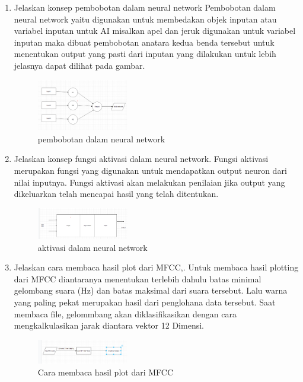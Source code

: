 \begin{enumerate}
	\item Jelaskan konsep pembobotan dalam neural network
	\hfill\break
	Pembobotan dalam neural network yaitu digunakan untuk membedakan objek inputan atau variabel inputan untuk AI misalkan apel dan jeruk digunakan untuk variabel inputan maka dibuat pembobotan anatara kedua benda tersebut untuk menentukan output yang pasti dari inputan yang dilakukan untuk lebih jelasnya dapat dilihat pada gambar.
    \begin{figure}[H]
	\centering
		\includegraphics[width=4cm]{figures/1174096/tugas6/teori_3.PNG}
		\caption{pembobotan dalam neural network}
	\end{figure}

	\item Jelaskan konsep fungsi aktivasi dalam neural network.
	\hfill\break
	Fungsi aktivasi merupakan fungsi yang digunakan untuk mendapatkan output neuron dari nilai inputnya. Fungsi aktivasi akan melakukan penilaian jika output yang dikeluarkan telah mencapai hasil yang telah ditentukan. 
    \begin{figure}[H]
	\centering
		\includegraphics[width=4cm]{figures/1174096/tugas6/teori_4.PNG}
		\caption{aktivasi dalam neural network}
	\end{figure}

	\item Jelaskan cara membaca hasil plot dari MFCC,.
	\hfill\break
	Untuk membaca hasil plotting dari MFCC diantaranya menentukan terlebih dahulu batas minimal gelombang suara (Hz) dan batas maksimal dari suara tersebut. Lalu warna yang paling pekat merupakan hasil dari penglohana data tersebut. Saat membaca file, gelommbang akan diklasifikasikan dengan cara mengkalkulasikan jarak diantara vektor 12 Dimensi. 
	\begin{figure}[H]
	\centering
		\includegraphics[width=4cm]{figures/1174096/tugas6/teori_5.PNG}
		\caption{Cara membaca hasil plot dari MFCC}
	\end{figure}


\end{enumerate}
